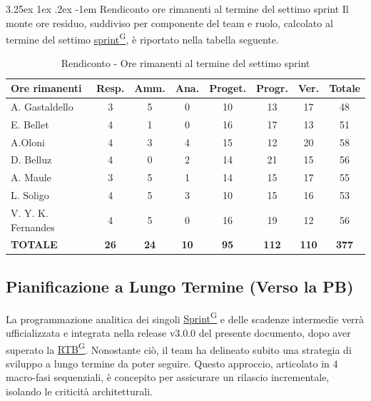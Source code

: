 \documentclass[a4paper,12pt]{article}
\makeatletter
\renewcommand\paragraph{\@startsection{paragraph}{5}{\z@}%
  {3.25ex \@plus1ex \@minus.2ex}%
  {-1em}%
  {\normalfont\normalsize\bfseries}}
\providecommand{\glslink}[2]{\href{https://alittlebyte-19.github.io/Documentazione/glossario.html\#gls-#1}{\underline{#2}\textsuperscript{\scriptsize G}}}
\makeatother
\begin{document}
\paragraph{Rendiconto ore rimanenti al termine del settimo sprint}
Il monte ore residuo, suddiviso per componente del team e ruolo, calcolato al termine del settimo \glslink{sprint}{sprint}, è riportato nella tabella seguente.
\begin{table}[htbp]
\centering
\renewcommand{\arraystretch}{1.5}
\begin{tabularx}{\textwidth}{|X|c|c|c|c|c|c|c|}
\hline
\textbf{Ore rimanenti} & \textbf{Resp.} & \textbf{Amm.} & \textbf{Ana.} & \textbf{Proget.} & \textbf{Progr.} & \textbf{Ver.} & \textbf{Totale} \\
\hline
A. Gastaldello & 3 & 5 & 0 & 10 & 13 & 17 & 48 \\
\hline
E. Bellet & 4 & 1 & 0 & 16 & 17 & 13 & 51 \\
\hline
A.Oloni & 4 & 3 & 4 & 15 & 12 & 20 & 58 \\
\hline
D. Belluz & 4 & 0 & 2 & 14 & 21 & 15 & 56 \\
\hline
A. Maule & 3 & 5 & 1 & 14 & 15 & 17 & 55 \\
\hline
L. Soligo & 4 & 5 & 3 & 10 & 15 & 16 & 53 \\
\hline
V. Y. K. Fernandes & 4 & 5 & 0 & 16 & 19 & 12 & 56 \\
\hline
\rowcolor{gray!20}
\textbf{TOTALE} & \textbf{26} & \textbf{24} & \textbf{10} & \textbf{95} & \textbf{112} & \textbf{110} & \textbf{377} \\
\hline
\end{tabularx}
\caption{Rendiconto - Ore rimanenti al termine del settimo sprint}
\end{table}


\newpage

\subsection{Pianificazione a Lungo Termine (Verso la PB)}
La programmazione analitica dei singoli \glslink{sprint}{Sprint} e delle scadenze intermedie verrà ufficializzata e integrata nella release v3.0.0 del presente documento, dopo aver superato la \glslink{rtb-requirements-and-technology-baseline}{RTB}. Nonostante ciò, il team ha delineato subito una strategia di sviluppo a lungo termine da poter seguire. Questo approccio, articolato in 4 macro-fasi sequenziali, è concepito per assicurare un rilascio incrementale, isolando le criticità architetturali.
\end{document}

